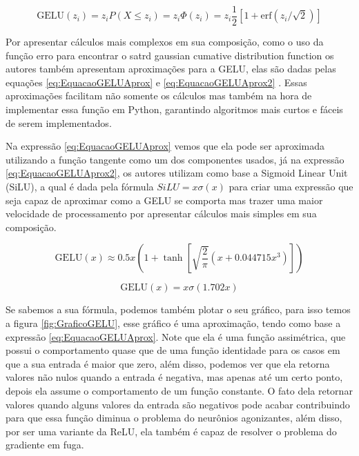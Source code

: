 \begin{equation}
    \text{GELU}(z_i) = z_i P(X \leqslant z_i) = z_i \Phi (z_i) = z_i \frac{1}{2} \left[ 1 + \text{erf} (z_i/ \sqrt{2}) \right]
    \label{eq:EquacaoGELU}
\end{equation}

Por apresentar cálculos mais complexos em sua composição, como o uso da função erro para encontrar o satrd gaussian cumative distribution function os autores também apresentam aproximações para a GELU, elas são dadas pelas equações \ref{eq:EquacaoGELUAprox} e \ref{eq:EquacaoGELUAprox2} \parencite{GELUArticle}. Essas aproximações facilitam não somente os cálculos mas também na hora de implementar essa função em Python, garantindo algoritmos mais curtos e fáceis de serem implementados.

Na expressão \ref{eq:EquacaoGELUAprox} vemos que ela pode ser aproximada utilizando a função tangente como um dos componentes usados, já na expressão \ref{eq:EquacaoGELUAprox2}, os autores utilizam como base a Sigmoid Linear Unit (SiLU), a qual é dada pela fórmula $SiLU = x\sigma(x)$ para criar uma expressão que seja capaz de aproximar como a GELU se comporta mas trazer uma maior velocidade de processamento por apresentar cálculos mais simples em sua composição.

\begin{equation}
    \text{GELU}(x) \approx 0.5x \left(1 + \tanh\left[\sqrt{\frac{2}{\pi}} \left(x + 0.044715x^3\right)\right]\right)
    \label{eq:EquacaoGELUAprox}
\end{equation}

\begin{equation}
    \text{GELU}(x) = x \sigma(1.702x)
    \label{eq:EquacaoGELUAprox2}
\end{equation}

Se sabemos a sua fórmula, podemos também plotar o seu gráfico, para isso temos a figura \ref{fig:GraficoGELU}, esse gráfico é uma aproximação, tendo como base a expressão \ref{eq:EquacaoGELUAprox}. Note que ela é uma função assimétrica, que possui o comportamento quase que de uma função identidade para os casos em que a sua entrada é maior que zero, além disso, podemos ver que ela retorna valores não nulos quando a entrada é negativa, mas apenas até um certo ponto, depois ela assume o comportamento de um função constante. O fato dela retornar valores quando alguns valores da entrada são negativos pode acabar contribuindo para que essa função diminua o problema do neurônios agonizantes, além disso, por ser uma variante da ReLU, ela também é capaz de resolver o problema do gradiente em fuga.

